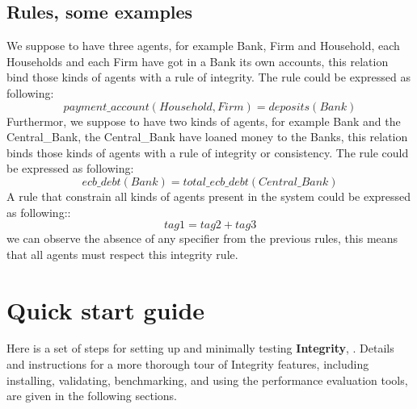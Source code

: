 \documentclass[a4paper,10pt]{article}
\begin{document}
\subsection{Rules, some examples}
We suppose to have three agents, for example Bank, Firm and Household,  each Households and each Firm have got in a Bank  its own accounts, this relation bind  those kinds of agents with a rule of integrity. 
The rule could be expressed as following:
\begin{equation}
payment \_ account(Household,Firm)=deposits(Bank)
\end{equation}
Furthermor, we suppose to have two kinds of agents, for example  Bank and the Central\_Bank,  the Central\_Bank  have loaned money to the Banks, this relation binds those kinds of agents with a rule of integrity or consistency. The rule could be expressed as following:
\begin{equation}
ecb\_debt(Bank) = total\_ecb\_debt(Central\_Bank)
\end{equation}
A rule that constrain all kinds of agents present in the system could be expressed as following::
\begin{equation}
tag1 = tag2+tag3
\end{equation}
we can observe the absence of any specifier from the previous rules, this means that all agents must respect this integrity rule. 
\section{Quick start guide}
Here is a set of steps for setting up and minimally testing \textbf{Integrity}, . Details and instructions for
a more thorough tour of Integrity features, including installing, validating, benchmarking,
and using the performance evaluation tools, are given in the following sections. 
\end{document}
